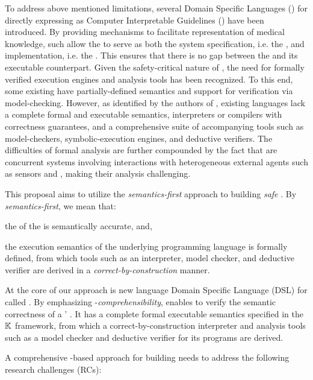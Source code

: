 To address above mentioned limitations, several Domain Specific Languages
(\DSLs{}) for directly expressing \BPGLogic{} as Computer Interpretable
Guidelines (\CIGs{}) have been introduced. By providing mechanisms to facilitate
representation of medical knowledge, such \DSLs{} allow the \CIG{} to serve
as both the system specification, i.e. the \BPG{}, and implementation, i.e. the
\BPGLogic{}. This ensures that there is no gap between the \BPG{} and
its executable counterpart.
Given the safety-critical nature of \CDSSs{}, the need for formally verified
execution engines and analysis tools has been recognized.
To this end, some existing \DSLs{} have partially-defined semantics and
support for verification via model-checking.
However, as identified by the authors of \cite{SuttonAMIA03, ShaharAMIA96},
existing languages lack a complete formal and executable semantics,
interpreters or compilers with correctness guarantees,
and a comprehensive suite of accompanying tools such as model-checkers, symbolic-execution
engines, and deductive verifiers. The difficulties of formal analysis are further compounded
by the fact that \CDSSs{} are concurrent systems involving interactions with
heterogeneous external agents such as sensors and
\HCPs{}, making their analysis challenging.

This proposal aims to utilize the \emph{semantics-first} approach
to building \emph{safe} \CDSSs{}. By \emph{semantics-first}, we
mean that:
\begin{enumerate*}[label=(\alph*)]
  \item the \BPGLogic{} of the \CDSS{} is semantically accurate, and,
  \item the execution semantics of the underlying programming language
    is formally defined, from which tools such as an interpreter, model checker,
    and deductive verifier are derived in a \emph{correct-by-construction}
    manner.
\end{enumerate*}
At the core of our approach is new language Domain Specific Language (DSL)
for \CIGs{} called \MediK{}. By emphasizing \HCP{}-\emph{comprehensibility},
\MediK{} enables \HCPs{} to verify the semantic correctness of a \CDSSs{}' \BPGLogic{}.
It has a complete formal executable semantics specified in the $\mathbb{K}{}$ framework,
from which a correct-by-construction interpreter and analysis tools
such as a model checker and deductive verifier for its programs are derived.

A comprehensive \MediK{}-based approach for building \CDSSs{}
needs to address the following research challenges (RCs):

